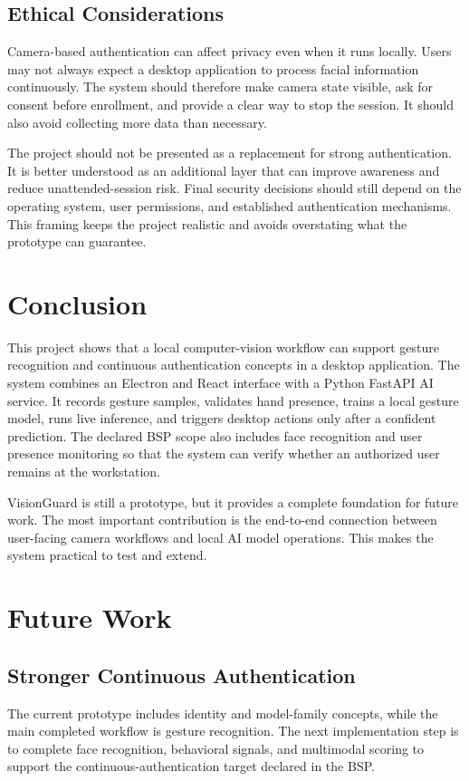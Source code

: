 \documentclass[10pt,twocolumn]{article}
\begin{document}
\subsection{Ethical Considerations}
Camera-based authentication can affect privacy even when it runs locally.
Users may not always expect a desktop application to process facial information continuously.
The system should therefore make camera state visible, ask for consent before enrollment, and provide a clear way to stop the session.
It should also avoid collecting more data than necessary.

The project should not be presented as a replacement for strong authentication.
It is better understood as an additional layer that can improve awareness and reduce unattended-session risk.
Final security decisions should still depend on the operating system, user permissions, and established authentication mechanisms.
This framing keeps the project realistic and avoids overstating what the prototype can guarantee.

\section{Conclusion}
This project shows that a local computer-vision workflow can support gesture recognition and continuous authentication concepts in a desktop application.
The system combines an Electron and React interface with a Python FastAPI AI service.
It records gesture samples, validates hand presence, trains a local gesture model, runs live inference, and triggers desktop actions only after a confident prediction.
The declared BSP scope also includes face recognition and user presence monitoring so that the system can verify whether an authorized user remains at the workstation.

VisionGuard is still a prototype, but it provides a complete foundation for future work.
The most important contribution is the end-to-end connection between user-facing camera workflows and local AI model operations.
This makes the system practical to test and extend.

\section{Future Work}
\subsection{Stronger Continuous Authentication}
The current prototype includes identity and model-family concepts, while the main completed workflow is gesture recognition.
The next implementation step is to complete face recognition, behavioral signals, and multimodal scoring to support the continuous-authentication target declared in the BSP.
\end{document}
